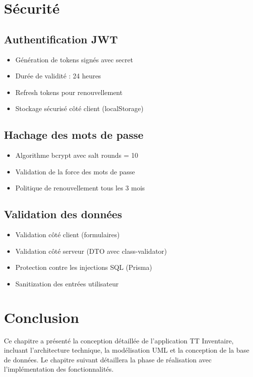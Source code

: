 \documentclass[12pt,a4paper]{report}
\begin{document}
\section{Sécurité}

\subsection{Authentification JWT}

\begin{itemize}
    \item Génération de tokens signés avec secret
    \item Durée de validité : 24 heures
    \item Refresh tokens pour renouvellement
    \item Stockage sécurisé côté client (localStorage)
\end{itemize}

\subsection{Hachage des mots de passe}

\begin{itemize}
    \item Algorithme bcrypt avec salt rounds = 10
    \item Validation de la force des mots de passe
    \item Politique de renouvellement tous les 3 mois
\end{itemize}

\subsection{Validation des données}

\begin{itemize}
    \item Validation côté client (formulaires)
    \item Validation côté serveur (DTO avec class-validator)
    \item Protection contre les injections SQL (Prisma)
    \item Sanitization des entrées utilisateur
\end{itemize}

\section{Conclusion}

Ce chapitre a présenté la conception détaillée de l'application TT Inventaire, incluant l'architecture technique, la modélisation UML et la conception de la base de données. Le chapitre suivant détaillera la phase de réalisation avec l'implémentation des fonctionnalités.

\end{document}
